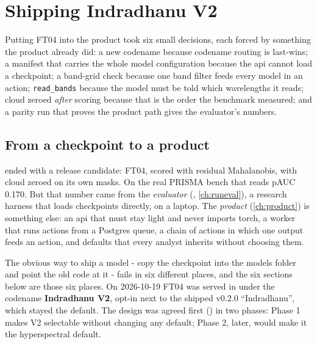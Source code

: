 \chapter{Shipping Indradhanu V2}\label{ch:shipping}
\begingroup\sloppy %

\begin{onething}
Putting FT04 into the product took six small decisions, each forced by something the product already did: a new
codename because codename routing is last-wins; a manifest that carries the whole model configuration because the api
cannot load a checkpoint; a band-grid check because one band filter feeds every model in an action;
\texttt{read\_bands} because the model must be told which wavelengths it reads; cloud zeroed \emph{after} scoring
because that is the order the benchmark measured; and a parity run that proves the product path gives the evaluator's
numbers.
\end{onething}

\section{From a checkpoint to a product}\label{sec:shipping:why}

 ended with a release candidate: FT04, scored with residual Mahalanobis, with cloud zeroed on its own
masks. On the real PRISMA bench that reads pAUC 0.170. But that number came from the \emph{evaluator}
(, \cref{ch:runeval}), a research harness that loads checkpoints directly, on a laptop. The
\emph{product} (\cref{ch:product}) is something else: an api that must stay light and never imports torch, a worker
that runs actions from a Postgres queue, a chain of actions in which one  output feeds an
 action, and defaults that every analyst inherits without choosing them.

The obvious way to ship a model - copy the checkpoint into the models folder and point the old code at it - fails in
six different places, and the six sections below are those six places. On 2026-10-19 FT04 was served in
 under the codename \textbf{Indradhanu V2}, opt-in next to the shipped v0.2.0 ``Indradhanu'',
which stayed the default. The design was agreed first () in two phases: Phase 1 makes
V2 selectable without changing any default; Phase 2, later, would make it the hyperspectral default.

